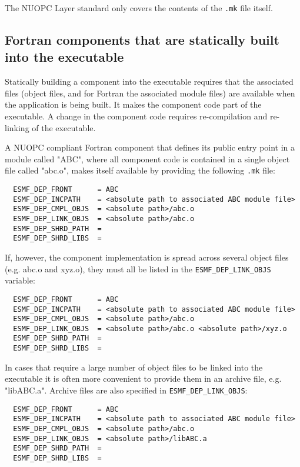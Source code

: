 The NUOPC Layer standard only covers the contents of the {\tt .mk} file itself.

\subsection{Fortran components that are statically built into the executable}
\label{StandardCompDep:FortranStatic}

Statically building a component into the executable requires that the associated files (object files, and for Fortran the associated module files) are available when the application is being built. It makes the component code part of the executable. A change in the component code requires re-compilation and re-linking of the executable.

A NUOPC compliant Fortran component that defines its public entry point in a module called "ABC", where all component code is contained in a single object file called "abc.o", makes itself available by providing the following {\tt .mk} file:

\begin{verbatim}
  ESMF_DEP_FRONT      = ABC
  ESMF_DEP_INCPATH    = <absolute path to associated ABC module file>
  ESMF_DEP_CMPL_OBJS  = <absolute path>/abc.o
  ESMF_DEP_LINK_OBJS  = <absolute path>/abc.o
  ESMF_DEP_SHRD_PATH  = 
  ESMF_DEP_SHRD_LIBS  =
\end{verbatim}

If, however, the component implementation is spread across several object files (e.g. abc.o and xyz.o), they must all be listed in the {\tt ESMF\_DEP\_LINK\_OBJS} variable:

\begin{verbatim}
  ESMF_DEP_FRONT      = ABC
  ESMF_DEP_INCPATH    = <absolute path to associated ABC module file>
  ESMF_DEP_CMPL_OBJS  = <absolute path>/abc.o
  ESMF_DEP_LINK_OBJS  = <absolute path>/abc.o <absolute path>/xyz.o
  ESMF_DEP_SHRD_PATH  = 
  ESMF_DEP_SHRD_LIBS  =
\end{verbatim}

In cases that require a large number of object files to be linked into the executable it is often more convenient to provide them in an archive file, e.g. "libABC.a". Archive files are also specified in {\tt ESMF\_DEP\_LINK\_OBJS}:

\begin{verbatim}
  ESMF_DEP_FRONT      = ABC
  ESMF_DEP_INCPATH    = <absolute path to associated ABC module file>
  ESMF_DEP_CMPL_OBJS  = <absolute path>/abc.o
  ESMF_DEP_LINK_OBJS  = <absolute path>/libABC.a
  ESMF_DEP_SHRD_PATH  = 
  ESMF_DEP_SHRD_LIBS  =
\end{verbatim}

